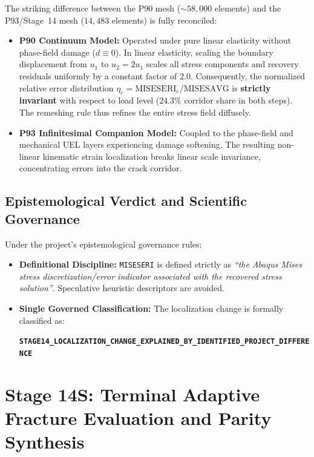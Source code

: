 The striking difference between the P90 mesh (${\sim}58,000$ elements) and the P93/Stage~14 mesh ($14,483$ elements) is fully reconciled:
\begin{itemize}
    \item \textbf{P90 Continuum Model:} Operated under pure linear elasticity without phase-field damage ($d \equiv 0$). In linear elasticity, scaling the boundary displacement from $u_1$ to $u_2 = 2 u_1$ scales all stress components and recovery residuals uniformly by a constant factor of $2.0$. Consequently, the normalized relative error distribution $\eta_e = \mathrm{MISESERI}_e / \mathrm{MISESAVG}$ is \textbf{strictly invariant} with respect to load level ($24.3\%$ corridor share in both steps). The remeshing rule thus refines the entire stress field diffusely.
    \item \textbf{P93 Infinitesimal Companion Model:} Coupled to the phase-field and mechanical UEL layers experiencing damage softening. The resulting non-linear kinematic strain localization breaks linear scale invariance, concentrating errors into the crack corridor.
\end{itemize}

\subsection{Epistemological Verdict and Scientific Governance}
\label{subsec:stage14r_governance}

Under the project's epistemological governance rules:
\begin{itemize}
    \item \textbf{Definitional Discipline:} \texttt{MISESERI} is defined strictly as \emph{``the Abaqus Mises stress discretization/error indicator associated with the recovered stress solution''}. Speculative heuristic descriptors are avoided.
    \item \textbf{Single Governed Classification:} The localization change is formally classified as:
    \begin{center}
    {\footnotesize\textbf{\texttt{STAGE14\_LOCALIZATION\_CHANGE\_EXPLAINED\_BY\_IDENTIFIED\_PROJECT\_DIFFERENCE}}}
    \end{center}
\end{itemize}


\section{Stage 14S: Terminal Adaptive Fracture Evaluation and Parity Synthesis}
\label{sec:stage14s_terminal_evaluation}

